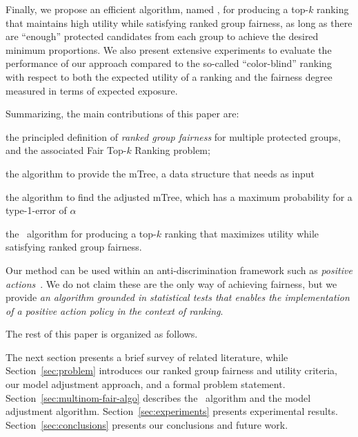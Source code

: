 Finally, we propose an efficient algorithm, named \algoFAIR, for producing a top-$k$ ranking that maintains high utility while satisfying ranked group fairness, as long as there are ``enough'' protected candidates from each group to achieve the desired minimum proportions.
%
We also present extensive experiments to evaluate the performance of our approach compared to the so-called ``color-blind'' ranking with respect to both the expected utility of a ranking and the fairness degree measured in terms of expected exposure.

\medskip

Summarizing, the main contributions of this paper are:
\begin{compactenum}
	\item the principled definition of \emph{ranked group fairness} for multiple protected groups, and the associated  {\sc Fair Top-$k$ Ranking problem};
	\item the \algoComputeMTree algorithm to provide the mTree, a data structure that \algoFAIR needs as input
	\item the \algoCorrect algorithm to find the adjusted mTree, which has a maximum probability for a type-1-error of $\alpha$
	\item the \algoFAIR\ algorithm for producing a top-$k$ ranking that maximizes utility while satisfying ranked group fairness.
\end{compactenum}

Our method can be used within an anti-discrimination framework such as \emph{positive actions}~\cite{sowell2005affirmative}.
%
We do not claim these are the only way of achieving fairness, but we provide \emph{an algorithm grounded in statistical tests that enables the implementation of a positive action policy in the context of ranking}.





The rest of this paper is organized as follows.


The next section presents a brief survey of related literature, while Section~\ref{sec:problem} introduces our ranked group fairness and utility criteria, our model adjustment approach, and a formal problem statement.
%
Section~\ref{sec:multinom-fair-algo} describes the \algoFAIR\ algorithm and the model adjustment algorithm.
%
Section~\ref{sec:experiments} presents experimental results.
%
Section~\ref{sec:conclusions} presents our conclusions and future work.
